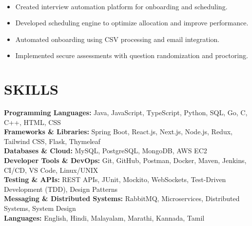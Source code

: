 \documentclass[10pt,a4paper]{article}
\begin{document}
\noindent
{}\\[-12pt]

\begin{itemize}

\item Created interview automation platform for onboarding and scheduling.

\item Developed scheduling engine to optimize allocation and improve performance.

\item Automated onboarding using CSV processing and email integration.

\item Implemented secure assessments with question randomization and proctoring.

\end{itemize}
\section*{SKILLS}

\small

\textbf{Programming Languages:}
Java, JavaScript, TypeScript, Python, SQL, Go, C, C++, HTML, CSS
\\[2pt]
\textbf{Frameworks \& Libraries:}
Spring Boot, React.js, Next.js, Node.js, Redux, Tailwind CSS, Flask, Thymeleaf
\\[2pt]
\textbf{Databases \& Cloud:}
MySQL, PostgreSQL, MongoDB, AWS EC2
\\[2pt]
\textbf{Developer Tools \& DevOps:}
Git, GitHub, Postman, Docker, Maven, Jenkins, CI/CD, VS Code, Linux/UNIX
\\[2pt]
\textbf{Testing \& APIs:}
REST APIs, JUnit, Mockito, WebSockets, Test-Driven Development (TDD), Design Patterns
\\[2pt]
\textbf{Messaging \& Distributed Systems:}
RabbitMQ, Microservices, Distributed Systems, System Design
\\[2pt]
\textbf{Languages:}
English, Hindi, Malayalam, Marathi, Kannada, Tamil

\end{document}
